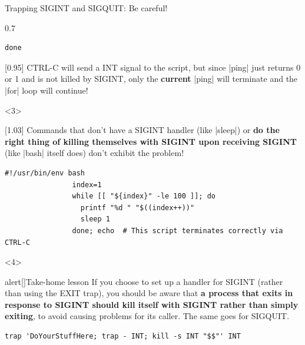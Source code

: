 \begin{frame}[fragile]{Trapping SIGINT and SIGQUIT: Be careful!}
\begin{overlayarea}{\textwidth}{0.7\textheight}
\begin{onlyenv}
\begin{lstlisting}[style=MyBash, aboveskip=0mm, belowskip=-6mm]
                done
            \end{lstlisting}
            \begin{varblock}{}[0.95\textwidth]{}
                \small CTRL-C will send a INT signal to the script, but since \bash|ping| just returns 0 or 1 and is not killed by SIGINT, only the \alert{\textbf{current}} \bash|ping| will terminate and the \bash|for| loop will continue!
            \end{varblock}
        \end{onlyenv}
        \begin{onlyenv}<3>
            \begin{varblock}{}[1.03\textwidth]{}
                Commands that don't have a SIGINT handler (like \bash|sleep|) or \textbf{do the right thing of killing themselves with SIGINT upon receiving SIGINT} (like \bash|bash| itself does) don't exhibit the problem!
            \end{varblock}
            \begin{lstlisting}[style=MyBash, firstnumber=5]
                #!/usr/bin/env bash
                index=1
                while [[ "${index}" -le 100 ]]; do
                  printf "%d " "$((index++))"
                  sleep 1
                done; echo  # This script terminates correctly via CTRL-C
            \end{lstlisting}
        \end{onlyenv}
        \begin{onlyenv}<4>
            \medskip
            \begin{varblock}{alert}[\textwidth]{\large Take-home lesson}
                If you choose to set up a handler for SIGINT (rather than using the EXIT trap), you should be aware that \alert{\textbf{a process that exits in response to SIGINT should kill itself with SIGINT rather than simply exiting}}, to avoid causing problems for its caller.
                The same goes for SIGQUIT.
            \end{varblock}
            \begin{lstlisting}[style=MyBash, numbers=none]
                trap 'DoYourStuffHere; trap - INT; kill -s INT "$$"' INT
            \end{lstlisting}
        \end{onlyenv}
    \end{overlayarea}
\end{frame}











